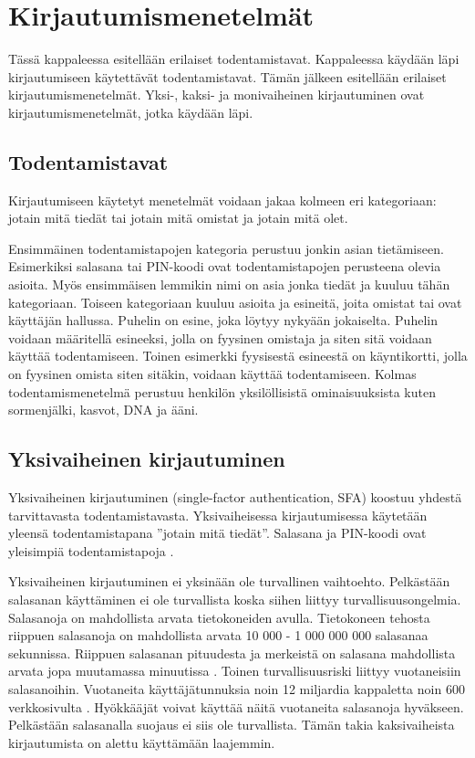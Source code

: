 \chapter{Kirjautumismenetelmät\label{kirjautumismenetelmät}}

Tässä kappaleessa esitellään erilaiset todentamistavat. Kappaleessa käydään läpi kirjautumiseen käytettävät todentamistavat. Tämän jälkeen esitellään erilaiset kirjautumismenetelmät. Yksi-, kaksi- ja monivaiheinen kirjautuminen ovat kirjautumismenetelmät, jotka käydään läpi.

\section{Todentamistavat}
Kirjautumiseen käytetyt menetelmät voidaan jakaa kolmeen eri kategoriaan: jotain mitä tiedät tai jotain mitä omistat ja jotain mitä olet.

Ensimmäinen todentamistapojen kategoria perustuu jonkin asian tietämiseen. Esimerkiksi salasana tai PIN-koodi ovat todentamistapojen perusteena olevia asioita. Myös ensimmäisen lemmikin nimi on asia jonka tiedät ja kuuluu tähän kategoriaan. Toiseen kategoriaan kuuluu asioita ja esineitä, joita omistat tai ovat käyttäjän hallussa. Puhelin on esine, joka löytyy nykyään jokaiselta. Puhelin voidaan määritellä esineeksi, jolla on fyysinen omistaja ja siten sitä voidaan käyttää todentamiseen. Toinen esimerkki fyysisestä esineestä on käyntikortti, jolla on fyysinen omista siten sitäkin, voidaan käyttää todentamiseen. Kolmas todentamismenetelmä perustuu henkilön yksilöllisistä ominaisuuksista kuten sormenjälki, kasvot, DNA ja ääni.

\section{Yksivaiheinen kirjautuminen}

Yksivaiheinen kirjautuminen (single-factor authentication, SFA) koostuu yhdestä tarvittavasta todentamistavasta. Yksivaiheisessa kirjautumisessa käytetään yleensä todentamistapana ”jotain mitä tiedät”. Salasana ja PIN-koodi ovat yleisimpiä todentamistapoja \citep{NIST_800_63B}.

Yksivaiheinen kirjautuminen ei yksinään ole turvallinen vaihtoehto. Pelkästään salasanan käyttäminen ei ole turvallista koska siihen liittyy turvallisuusongelmia. Salasanoja on mahdollista arvata tietokoneiden avulla. Tietokoneen tehosta riippuen salasanoja on mahdollista arvata 10 000 - 1 000 000 000 salasanaa sekunnissa. Riippuen salasanan pituudesta ja merkeistä on salasana mahdollista arvata jopa muutamassa minuutissa \citep{brute_force_attack}. Toinen turvallisuusriski liittyy vuotaneisiin salasanoihin. Vuotaneita käyttäjätunnuksia noin 12 miljardia kappaletta noin 600 verkkosivulta \citep{Have_i_been_pwned}. Hyökkääjät voivat käyttää näitä vuotaneita salasanoja hyväkseen. Pelkästään salasanalla suojaus ei siis ole turvallista. Tämän takia kaksivaiheista kirjautumista on alettu käyttämään laajemmin. 


